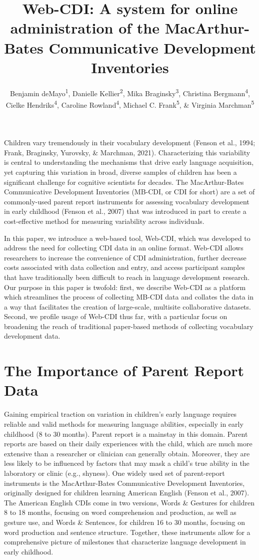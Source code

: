 \documentclass[
  english,
  ,man,floatsintext]{apa6}
\title{Web-CDI: A system for online administration of the MacArthur-Bates Communicative Development Inventories}
\author{Benjamin deMayo\textsuperscript{1}, Danielle Kellier\textsuperscript{2}, Mika Braginsky\textsuperscript{3}, Christina Bergmann\textsuperscript{4}, Cielke Hendriks\textsuperscript{4}, Caroline Rowland\textsuperscript{4}, Michael C. Frank\textsuperscript{5}, \& Virginia Marchman\textsuperscript{5}}
\date{}
\affiliation{\vspace{0.5cm}\textsuperscript{1} Princeton University\\\textsuperscript{2} University of Pennsylvania\\\textsuperscript{3} Massachussetts Institute of Technology\\\textsuperscript{4} Max Planck Institute for Psycholinguistics\\\textsuperscript{5} Stanford University}
\begin{document}
\maketitle

Children vary tremendously in their vocabulary development (Fenson et al., 1994; Frank, Braginsky, Yurovsky, \& Marchman, 2021). Characterizing this variability is central to understanding the mechanisms that drive early language acquisition, yet capturing this variation in broad, diverse samples of children has been a significant challenge for cognitive scientists for decades. The MacArthur-Bates Communicative Development Inventories (MB-CDI, or CDI for short) are a set of commonly-used parent report instruments for assessing vocabulary development in early childhood (Fenson et al., 2007) that was introduced in part to create a cost-effective method for measuring variability across individuals.

In this paper, we introduce a web-based tool, Web-CDI, which was developed to address the need for collecting CDI data in an online format. Web-CDI allows researchers to increase the convenience of CDI administration, further decrease costs associated with data collection and entry, and access participant samples that have traditionally been difficult to reach in language development research. Our purpose in this paper is twofold: first, we describe Web-CDI as a platform which streamlines the process of collecting MB-CDI data and collates the data in a way that facilitates the creation of large-scale, multisite collaborative datasets. Second, we profile usage of Web-CDI thus far, with a particular focus on broadening the reach of traditional paper-based methods of collecting vocabulary development data.

\hypertarget{the-importance-of-parent-report-data}{%
\section{The Importance of Parent Report Data}\label{the-importance-of-parent-report-data}}

Gaining empirical traction on variation in children's early language requires reliable and valid methods for measuring language abilities, especially in early childhood (8 to 30 months). Parent report is a mainstay in this domain. Parent reports are based on their daily experiences with the child, which are much more extensive than a researcher or clinician can generally obtain. Moreover, they are less likely to be influenced by factors that may mask a child's true ability in the laboratory or clinic (e.g., shyness). One widely used set of parent-report instruments is the MacArthur-Bates Communicative Development Inventories, originally designed for children learning American English (Fenson et al., 2007). The American English CDIs come in two versions, Words \& Gestures for children 8 to 18 months, focusing on word comprehension and production, as well as gesture use, and Words \& Sentences, for children 16 to 30 months, focusing on word production and sentence structure. Together, these instruments allow for a comprehensive picture of milestones that characterize language development in early childhood.
\end{document}
